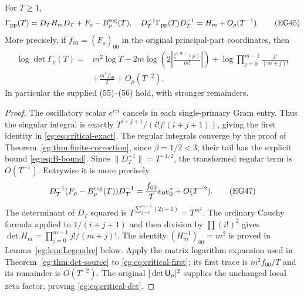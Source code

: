 \documentclass[11pt]{article}
\begin{document}
\begin{egtheorem}
\label{eg:thm:critical}
For $T\ge1$,
\[
 \Gamma_{\rm pp}(T)=D_TH_mD_T+F_\rho-B_\rho^{\rm reg}(T),
 \quad D_T^{-1}\Gamma_{\rm pp}(T)D_T^{-1}=H_m+O_\rho(T^{-1}).
 \tag{EG45}\label{eg:eq:critical-exact}
\]
More precisely, if $f_{00}=(F_\rho)_{00}$ in the original principal-part
coordinates, then
\[
 \begin{split}
 \log\det\Gamma_\rho(T)={}&m^2\log T
 -2m\log\left(2\left|\frac{\zeta^{(m)}(\rho)}{m!}\right|\right)
 +\log\prod_{j=0}^{m-1}\frac{j!}{(m+j)!}\\
 &+\frac{m^2 f_{00}}T+O_\rho(T^{-2}).
 \end{split}\tag{EG46}\label{eg:eq:critical-det}
\]
In particular the supplied (55)--(56) hold, with stronger remainders.
\end{egtheorem}
\begin{proof}
The oscillatory scalar $e^{i\gamma t}$ cancels in each single-primary
Gram entry. Thus the singular integral is exactly
$T^{i+j+1}/(i!j!(i+j+1))$, giving the first identity in
\eqref{eg:eq:critical-exact}. The regular integrals converge by the
proof of Theorem~\ref{eg:thm:finite-correction}, since $\beta=1/2<3$;
their tail has the explicit bound \eqref{eg:eq:B-bound}. Since
$\|D_T^{-1}\|=T^{-1/2}$, the transformed regular term is $O(T^{-1})$.
Entrywise it is more precisely
\[
 D_T^{-1}(F_\rho-B_\rho^{\rm reg}(T))D_T^{-1}
                       =\frac{f_{00}}T e_0e_0^*+O(T^{-2}).
 \tag{EG47}\label{eg:eq:critical-first}
\]
The determinant of $D_T$ squared is $T^{\sum_{j=0}^{m-1}(2j+1)}
=T^{m^2}$. The ordinary Cauchy formula applied to $1/(i+j+1)$
and then division by $\prod(i!)^2$ gives
$\det H_m=\prod_{j=0}^{m-1}j!/(m+j)!$.
The identity $(H_m^{-1})_{00}=m^2$ is proved in
Lemma~\ref{eg:lem:Legendre} below. Apply the matrix logarithm expansion
used in Theorem~\ref{eg:thm:det-source} to \eqref{eg:eq:critical-first};
its first trace is $m^2f_{00}/T$ and its remainder is $O(T^{-2})$.
The original $|\det\mathsf U_\rho|^2$ supplies the unchanged local zeta
factor, proving \eqref{eg:eq:critical-det}.
\end{proof}
\end{document}
